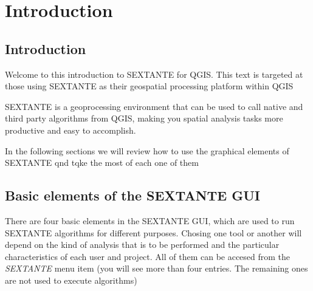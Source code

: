 \chapter{Introduction}

\section{Introduction}

Welcome to this introduction to SEXTANTE for QGIS. This text is targeted at those using SEXTANTE as their geospatial processing platform within QGIS

SEXTANTE is a geoprocessing environment that can be used to call native and third party algorithms from QGIS, making you spatial analysis tasks more productive and easy to accomplish.

In the following sections we will review how to use the graphical elements of SEXTANTE qnd tqke the most of each one of them


\section{Basic elements of the SEXTANTE GUI}

There are four basic elements in the SEXTANTE GUI, which are used to run SEXTANTE algorithms for different purposes. Chosing one tool or another will depend on the kind of analysis that is to be performed and the particular characteristics of each user and project. All of them can be accesed from the \emph{SEXTANTE} menu item (you will see more than four entries. The remaining ones are not used to execute algorithms)

